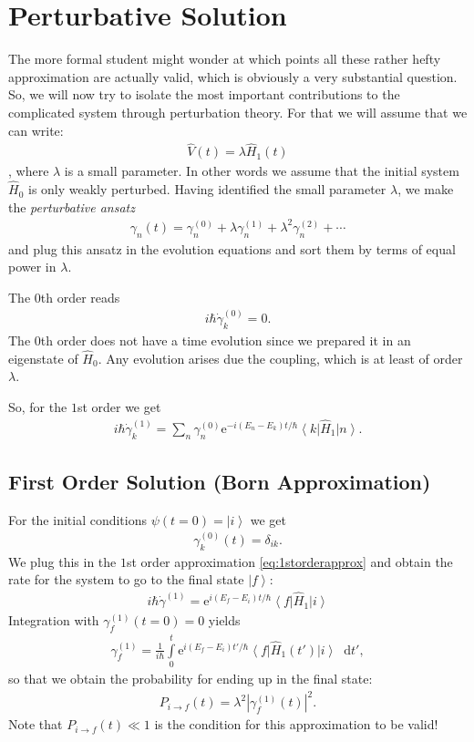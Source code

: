 \documentclass[10pt]{article}
\newcommand{\bra}[1]{\ensuremath{\left\langle#1\right|}}
\newcommand{\ket}[1]{\ensuremath{\left|#1\right\rangle}}
\newcommand*\dif{\mathop{}\!\mathrm{d}}
\newcommand{\eexp}[1]{\mathrm{e}^{#1}}
\begin{document}
\section{Perturbative Solution}
The more formal student might wonder at which points all these rather hefty approximation are actually valid, which is obviously a very substantial question. So, we will now try to isolate the most important contributions to the complicated system through perturbation theory. For that we will assume that we can write:
\begin{align}
\hat{V}(t) =\lambda \hat{H}_1(t)
\end{align}
, where $\lambda$ is a small parameter. In other words we assume that the initial system $\hat{H}_0$ is only weakly perturbed.
Having identified the small parameter $\lambda$, we make the \textit{perturbative ansatz} 
\begin{align}
    \gamma_n(t) = \gamma_n^{(0)} + \lambda \gamma_n^{(1)} + \lambda^2 \gamma_n^{(2)} + \cdots
\end{align}
and plug this ansatz in the evolution equations and sort them by terms of equal power in $\lambda$.

The $0$th order reads
\begin{align}
 i\hbar \dot{\gamma}_k^{(0)} = 0.
\end{align}
The $0$th order does not have a time evolution since we prepared it in an eigenstate of $\hat{H}_0$. Any evolution arises due the coupling, which is at least of order $\lambda$.

So, for the $1$st order we get
\begin{align} \label{eq:1storderapprox}
i\hbar \dot{\gamma}_k^{(1)} = \sum_n \gamma_n^{(0)} \eexp{-i(E_n-E_k)t/{\hbar}}\bra{k}\hat{H}_1\ket{n}.
\end{align}

\subsection{First Order Solution (Born Approximation)}
For the initial conditions $\psi(t=0)=\ket{i}$ we get
\begin{align}
\gamma_k^{(0)}(t) = \delta_{ik}.
\end{align}
We plug this in the $1$st order approximation \eqref{eq:1storderapprox} and obtain the rate for the system to go to the final state $\ket{f}$:
%
\begin{align}
i \hbar\dot{\gamma}^{(1)} = \eexp{i(E_f-E_i)t/{\hbar}} \bra{f}\hat{H}_1 \ket{i}
\end{align}
Integration with $\gamma_f^{(1)}(t=0) = 0$ yields
\begin{align}\label{eq:gammaf1}
\gamma_f^{(1)} = \frac{1}{i\hbar}\int\limits_0^t \eexp{i(E_f-E_i)t'/{\hbar}} \bra{f} \hat{H}_1(t')\ket{i} \dif t',
\end{align}
so that we obtain the probability for ending up in the final state:
\begin{align}
P_{i\to f}(t) = \lambda^2\left| \gamma_f^{(1)}(t)\right|^2.
\end{align}
Note that  $ P_{i\to f}(t) \ll 1$ is the condition for this approximation to be valid!
\end{document}
